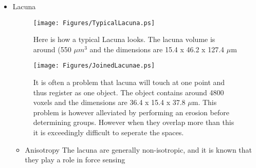 \begin{itemize}
	\item Lacuna
\begin{figure}[htp]
 \centering
\begin{center}
 \texttt{[image: Figures/TypicalLacuna.ps]}
\end{center}
 \caption{Here is how a typical Lacuna looks. The lacuna volume is around (550 $\mu m^3$ and the dimensions are 15.4 x 46.2 x 127.4 $\mu$m}
 \label{fig:NormLacun}
\end{figure}	

\begin{figure}[htp]
 \centering
\begin{center}
 \texttt{[image: Figures/JoinedLacunae.ps]}
\end{center}

 \caption{It is often a problem that lacuna will touch at one point and thus register as one object. The object contains around 4800 voxels and the dimensions are 36.4 x 15.4 x 37.8 $\mu$m. This problem is however alleviated by performing an erosion before determining groups. However when they overlap more than this it is exceedingly difficult to seperate the spaces. }
 \label{fig:TwoLacun}
\end{figure}
	\begin{itemize}
		\item Anisotropy
The lacuna are generally non-isotropic, and it is known that they play a role in force sensing



\end{itemize}
\end{itemize}
